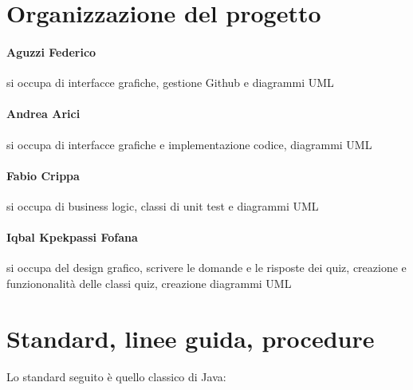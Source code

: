\documentclass[12pt]{article}
\begin{document}
\section{Organizzazione del progetto}

\paragraph{Aguzzi Federico} si occupa di interfacce grafiche, gestione Github e
diagrammi UML

\paragraph{Andrea Arici} si occupa di interfacce grafiche e implementazione
codice, diagrammi UML

\paragraph{Fabio Crippa} si occupa di business logic, classi di unit test e
diagrammi UML

\paragraph{Iqbal Kpekpassi Fofana} si occupa del design grafico, scrivere le
domande e le risposte dei quiz, creazione e funziononalità delle classi quiz,
creazione diagrammi UML


\section{Standard, linee guida, procedure}

Lo standard seguito è quello classico di Java:
\end{document}
